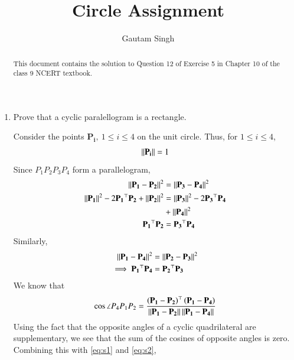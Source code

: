\documentclass[journal,12pt,twocolumn]{IEEEtran}
\renewcommand{\vec}[1]{\boldsymbol{\mathbf{#1}}}
\begin{document}
\vspace{3cm}
\title{Circle Assignment}
\author{Gautam Singh}
\maketitle
\bigskip

\begin{abstract}
    This document contains the solution to Question 12 of 
    Exercise 5 in Chapter 10 of the class 9 NCERT textbook.
\end{abstract}

\begin{enumerate}
    \item Prove that a cyclic paralellogram is a rectangle.

    \solution Consider the points $\vec{P_i},\ 1 \le i \le 4$ on the 
    unit circle. Thus, for $1 \le i \le 4$,
    \begin{align}
        \norm{\vec{P_i}} = 1
        \label{eq:vec-mod}
    \end{align}
    Since $P_1P_2P_3P_4$ form a parallelogram,
    \begin{align}
        \norm{\vec{P_1}-\vec{P_2}}^2 &= \norm{\vec{P_3}-\vec{P_4}}^2 \label{eq:s1} \\
        \norm{\vec{P_1}}^2 - 2\vec{P_1}^\top\vec{P_2} + \norm{\vec{P_2}}^2 &= \norm{\vec{P_3}}^2 - 2\vec{P_3}^\top\vec{P_4} \nonumber \\ &+ \norm{\vec{P_4}}^2 \\
        \vec{P_1}^\top\vec{P_2} &= \vec{P_3}^\top\vec{P_4}
        \label{eq:dot-prod-1}
    \end{align}
    Similarly,
    \begin{align}
        \norm{\vec{P_1}-\vec{P_4}}^2 &= \norm{\vec{P_2}-\vec{P_3}}^2 \label{eq:s2} \\
        \implies \vec{P_1}^\top\vec{P_4} &= \vec{P_2}^\top\vec{P_3}
        \label{eq:dot-prod-2}
    \end{align}
    We know that
    \begin{align}
        \cos\angle{P_4P_1P_2} = \frac{\brak{\vec{P_1}-\vec{P_2}}^\top\brak{\vec{P_1}-\vec{P_4}}}{\norm{\vec{P_1}-\vec{P_2}}\norm{\vec{P_1}-\vec{P_4}}}
        \label{eq:angle-cyc}
    \end{align}
    Using the fact that the opposite angles of a cyclic quadrilateral are 
    supplementary, we see that the sum of the cosines of opposite angles is
    zero. Combining this with \eqref{eq:s1} and \eqref{eq:s2},
    \begin{align}

\end{align}
\end{enumerate}
\end{document}

